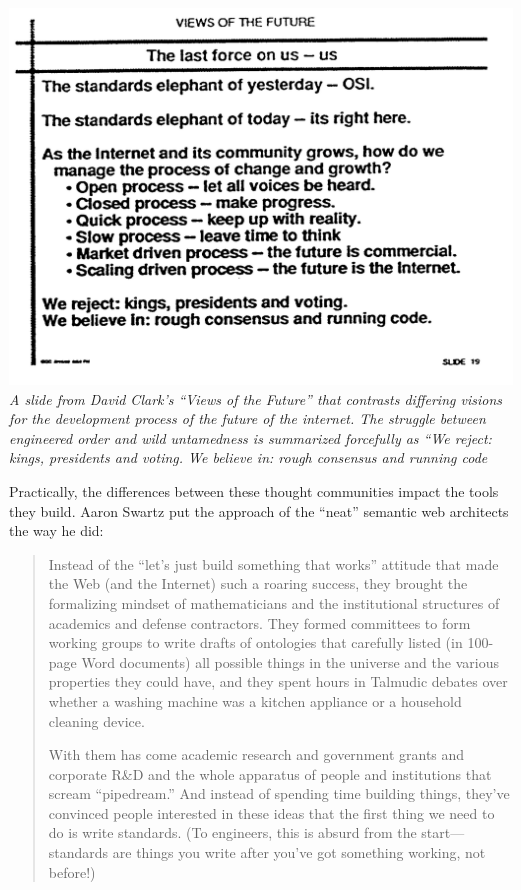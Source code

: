 \documentclass[10pt]{article}
\begin{document}
\begin{multicols}{2}
\includegraphics[width=\linewidth]{../assets/images/clark-slide.png} \emph{A
slide from David Clark's ``Views of the Future''\cite{clarkCloudyCrystalBall1992}  that contrasts differing visions for the
development process of the future of the internet. The struggle between
engineered order and wild untamedness is summarized forcefully as ``We
reject: kings, presidents and voting. We believe in: rough consensus and
running code}

Practically, the differences between these thought communities impact
the tools they build. Aaron Swartz put the approach of the ``neat''
semantic web architects the way he did:

\begin{quote}
Instead of the ``let's just build something that works'' attitude that
made the Web (and the Internet) such a roaring success, they brought the
formalizing mindset of mathematicians and the institutional structures
of academics and defense contractors. They formed committees to form
working groups to write drafts of ontologies that carefully listed (in
100-page Word documents) all possible things in the universe and the
various properties they could have, and they spent hours in Talmudic
debates over whether a washing machine was a kitchen appliance or a
household cleaning device.

With them has come academic research and government grants and corporate
R\&D and the whole apparatus of people and institutions that scream
``pipedream.'' And instead of spending time building things, they've
convinced people interested in these ideas that the first thing we need
to do is write standards. (To engineers, this is absurd from the
start---standards are things you write after you've got something
working, not before!) \cite{swartzAaronSwartzProgrammable2013} 
\end{quote}


\end{multicols}
\end{document}
